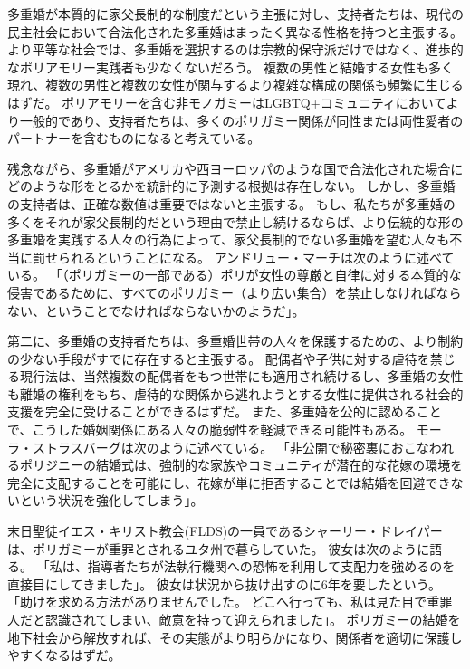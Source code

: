 \documentclass[paper=a4,book,openany]{jlreq} \usepackage{mystyle}
\begin{document}
多重婚が本質的に家父長制的な制度だという主張に対し、支持者たちは、現代の民主社会において合法化された多重婚はまったく異なる性格を持つと主張する。
より平等な社会では、多重婚を選択するのは宗教的保守派だけではなく、進歩的なポリアモリー実践者も少なくないだろう。
複数の男性と結婚する女性も多く現れ、複数の男性と複数の女性が関与するより複雑な構成の関係も頻繁に生じるはずだ。
ポリアモリーを含む非モノガミーはLGBTQ+コミュニティにおいてより一般的であり、支持者たちは、多くのポリガミー関係が同性または両性愛者のパートナーを含むものになると考えている。

残念ながら、多重婚がアメリカや西ヨーロッパのような国で合法化された場合にどのような形をとるかを統計的に予測する根拠は存在しない。
しかし、多重婚の支持者は、正確な数値は重要ではないと主張する。
もし、私たちが多重婚の多くをそれが家父長制的だという理由で禁止し続けるならば、より伝統的な形の多重婚を実践する人々の行為によって、家父長制的でない多重婚を望む人々も不当に罰せられるということになる。
アンドリュー・マーチは次のように述べている。
「（ポリガミーの一部である）ポリが女性の尊厳と自律に対する本質的な侵害であるために、すべてのポリガミー（より広い集合）を禁止しなければならない、ということでなければならないかのようだ」\citep{march11:_is_there_right_polyg}。

第二に、多重婚の支持者たちは、多重婚世帯の人々を保護するための、より制約の少ない手段がすでに存在すると主張する。
配偶者や子供に対する虐待を禁じる現行法は、当然複数の配偶者をもつ世帯にも適用され続けるし、多重婚の女性も離婚の権利をもち、虐待的な関係から逃れようとする女性に提供される社会的支援を完全に受けることができるはずだ。
また、多重婚を公的に認めることで、こうした婚姻関係にある人々の脆弱性を軽減できる可能性もある。
モーラ・ストラスバーグは次のように述べている。
「非公開で秘密裏におこなわれるポリジニーの結婚式は、強制的な家族やコミュニティが潜在的な花嫁の環境を完全に支配することを可能にし、花嫁が単に拒否することでは結婚を回避できないという状況を強化してしまう」\citep[p.369 fn.116.5]{strassberg02:_crime_polyg}。

末日聖徒イエス・キリスト教会(FLDS)の一員であるシャーリー・ドレイパーは、ポリガミーが重罪とされるユタ州で暮らしていた。
彼女は次のように語る。
「私は、指導者たちが法執行機関への恐怖を利用して支配力を強めるのを直接目にしてきました」。
彼女は状況から抜け出すのに6年を要したという。
「助けを求める方法がありませんでした。
どこへ行っても、私は見た目で重罪人だと認識されてしまい、敵意を持って迎えられました」\citep{smardon20:_polyg_is_decrim_utah}。
ポリガミーの結婚を地下社会から解放すれば、その実態がより明らかになり、関係者を適切に保護しやすくなるはずだ。
\end{document}
